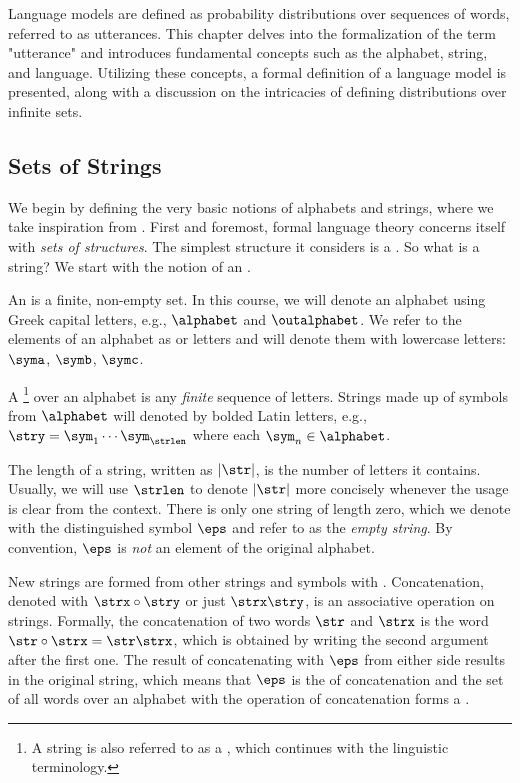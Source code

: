 Language models are defined as probability distributions over sequences of words, referred to as utterances. This chapter delves into the formalization of the term "utterance" and introduces fundamental concepts such as the alphabet, string, and language. Utilizing these concepts, a formal definition of a language model is presented, along with a discussion on the intricacies of defining distributions over infinite sets.

\subsection{Sets of Strings}
We begin by defining the very basic notions of alphabets and strings, where we take inspiration from .
First and foremost, formal language theory concerns itself with \emph{sets of structures}.
The simplest structure it considers is a .
So what is a string?
We start with the notion of an .
\begin{definition}[Alphabet]
An  is a finite, non-empty set.
In this course, we will denote an alphabet using Greek capital letters, e.g., $\alphabet$ and $\outalphabet$.
We refer to the elements of an alphabet as  or letters and will denote them with lowercase letters: $\syma$, $\symb$, $\symc$. 
\end{definition}

\begin{definition}[String]
A \footnote{A string is also referred to as a , which continues with the linguistic terminology.} over an alphabet is any \emph{finite} sequence of letters. 
Strings made up of symbols from $\alphabet$ will denoted by bolded Latin letters, e.g., $\stry = \sym_1 \cdots \sym_\strlen$ where each $\sym_n \in \alphabet$.
\end{definition}

The length of a string, written as $|\str|$, is the number of letters it contains. 
Usually, we will use $\strlen$ to denote $|\str|$ more concisely whenever the usage is clear from the context.
There is only one string of length zero, which we denote with the distinguished symbol $\eps$ and refer to as the \emph{empty string}.
By convention, $\eps$ is \emph{not} an element of the original alphabet.

New strings are formed from other strings and symbols with .
Concatenation, denoted with $\strx \circ \stry$ or just $\strx\stry$, is an associative operation on strings.
Formally, the concatenation of two words $\str$ and $\strx$ is the word $\str \circ \strx = \str \strx$, which is obtained by writing the second argument after the first one. 
The result of concatenating with $\eps$ from either side results in the original string, which means that $\eps$ is the  of concatenation and the set of all words over an alphabet with the operation of concatenation forms a .
 
